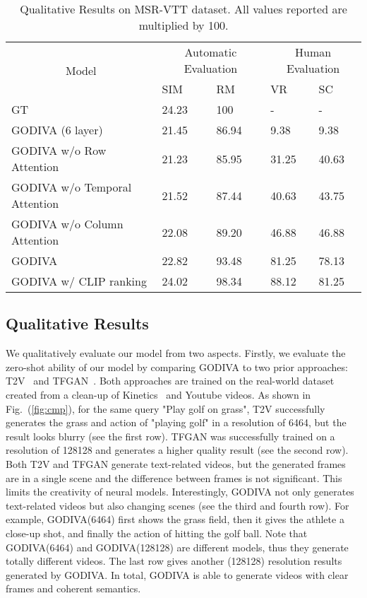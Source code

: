 \documentclass{article}
\begin{document}
\newcommand{\pwidth}{1.3cm}
\begin{table*}[h]
\begin{center}
\caption{Qualitative Results on MSR-VTT dataset. All values reported
are multiplied by 100.}
\label{tab:mod}
\begin{tabular}{p{6cm}p{\pwidth}p{\pwidth}p{\pwidth}p{\pwidth}}
\toprule
\multicolumn{1}{c}{\multirow{2}{*}{Model}}&\multicolumn{2}{c}{Automatic Evaluation} & \multicolumn{2}{c}{Human Evaluation}\\
\cmidrule{2-3} \cmidrule{4-5}
 & SIM & RM & VR & SC  \\
\midrule
GT & 24.23 & 100 & - & -   \\

GODIVA (6 layer) & 21.45 & 86.94 & 9.38 & 9.38 \\
GODIVA w/o Row Attention & 21.23 & 85.95 & 31.25 & 40.63   \\
GODIVA w/o Temporal Attention  & 21.52 & 87.44 & 40.63 & 43.75  \\
GODIVA w/o Column Attention  & 22.08 & 89.20 & 46.88 & 46.88  \\
GODIVA  & 22.82 & 93.48 & 81.25 & 78.13\\
GODIVA w/ CLIP ranking  & 24.02 & 98.34 & 88.12 & 81.25  \\
\bottomrule
\end{tabular}
\label{tab:metric}
\end{center}
\end{table*}





\subsection{Qualitative Results}


We qualitatively evaluate our model from two aspects. 
Firstly, we evaluate the zero-shot ability of our model by comparing GODIVA to two prior approaches: T2V~\cite{liVideoGenerationText2018} and TFGAN~\cite{balajiConditionalGANDiscriminative2019}. Both approaches are trained on the real-world dataset created from a clean-up of  Kinetics~\cite{kayKineticsHumanAction2017} and Youtube videos. As shown in Fig.~(\ref{fig:cmp}), for the same query "Play golf on grass", T2V successfully generates the grass and action of "playing golf" in a resolution of 6464, but the result looks blurry (see the first row). TFGAN was successfully trained on a resolution of 128128 and generates a higher quality result (see the second row).  Both T2V and TFGAN generate text-related videos, but the generated frames are in a single scene and the difference between frames is not significant. This limits the creativity of neural models. Interestingly, GODIVA not only generates text-related videos but also changing scenes (see the third and fourth row). For example, GODIVA(6464) first shows the grass field, then it gives the athlete a close-up shot, and finally the action of hitting the golf ball. Note that GODIVA(6464) and GODIVA(128128) are different models, thus they generate totally different videos.  The last row gives another (128128) resolution results generated by GODIVA. In total, GODIVA is able to generate videos with clear frames and coherent semantics.
\end{document}
